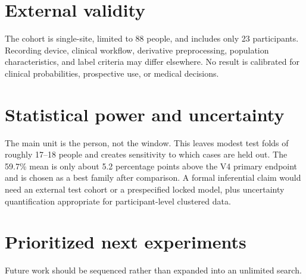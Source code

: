 \section{External validity}

The cohort is single-site, limited to 88 people, and includes only 23 \FTD{}
participants. Recording device, clinical workflow, derivative preprocessing,
population characteristics, and label criteria may differ elsewhere. No result
is calibrated for clinical probabilities, prospective use, or medical decisions.

\section{Statistical power and uncertainty}

The main unit is the person, not the window. This leaves modest test folds of
roughly 17--18 people and creates sensitivity to which \FTD{} cases are held out.
The 59.7\% mean is only about 5.2 percentage points above the V4 primary endpoint
and is chosen as a best family after comparison. A formal inferential claim would
need an external test cohort or a prespecified locked model, plus uncertainty
quantification appropriate for participant-level clustered data.

\section{Prioritized next experiments}

Future work should be sequenced rather than expanded into an unlimited search.

